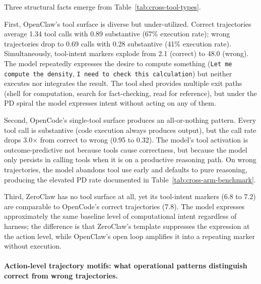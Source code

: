 
Three structural facts emerge from Table~\ref{tab:cross-tool-types}.

First, OpenClaw's tool surface is diverse but under-utilized.
Correct trajectories average 1.34 tool calls with 0.89 substantive (67\%
execution rate); wrong trajectories drop to 0.69 calls with 0.28 substantive
(41\% execution rate).
Simultaneously, tool-intent markers explode from 2.1 (correct) to 48.0
(wrong).
The model repeatedly expresses the desire to compute something
(\texttt{Let me compute the density}, \texttt{I need to check this
calculation}) but neither executes nor integrates the result.
The tool shed provides multiple exit paths (shell for computation, search
for fact-checking, read for reference), but under the PD spiral the model
expresses intent without acting on any of them.

Second, OpenCode's single-tool surface produces an all-or-nothing pattern.
Every tool call is substantive (code execution always produces output), but
the call rate drops 3.0$\times$ from correct to wrong (0.95 to 0.32).
The model's tool activation is outcome-predictive not because tools cause
correctness, but because the model only persists in calling tools when it is
on a productive reasoning path.
On wrong trajectories, the model abandons tool use early and defaults to
pure reasoning, producing the elevated PD rate documented in
Table~\ref{tab:cross-arm-benchmark}.

Third, ZeroClaw has no tool surface at all, yet its tool-intent markers
(6.8 to 7.2) are comparable to OpenCode's correct trajectories (7.8).
The model expresses approximately the same baseline level of computational
intent regardless of harness; the difference is that ZeroClaw's template
suppresses the expression at the action level, while OpenClaw's open loop
amplifies it into a repeating marker without execution.

\paragraph{Action-level trajectory motifs: what operational patterns
distinguish correct from wrong trajectories.}

